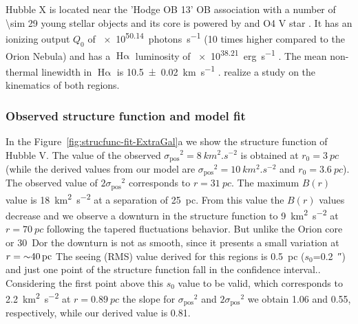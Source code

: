 \documentclass[fleqn,usenatbib, useAMS, a4paper]{mnras}
\newcommand\pos{\ensuremath{_{\mathrm{pos}}}}
\newcommand\ha{\ensuremath{\text{H}\upalpha}}
\begin{document}
Hubble X is located near the 'Hodge OB 13' OB association with a number of \num{\sim 29} young stellar objects \citep{2021MNRAS.507.5106K} and its core is powered by and O4 V star \citep{1999PASP..111.1382O}.
It has an ionizing output \(Q_0\) of \SI{e50.14}{photons.s^{-1}} (10 times higher compared to the Orion Nebula) and has a \ha{} luminosity of \SI{e38.21}{erg.s^{-1}} \citep{2002MNRAS.329..481B}.
The mean non-thermal linewidth in \ha{} is \SI{10.5 \pm 0.02}{km.s^{-1}}  \citep{1986A&A...160..374H}.
\citet{1993PASJ...45..693T} realize a study on the kinematics of both regions. 


\subsubsection{Observed structure function and model fit}
\label{sec:observ-struct-funct-hubbles}

In the Figure~\ref{fig:strucfunc-fit-ExtraGal}a we show the structure function of Hubble V.
The value of the observed \(\sigma\pos^2 = \SI{8}{km^{2}.s^{-2}}\) is obtained at \(r_0 = \SI{3}{pc} \) (while the derived values from our model are \(\sigma\pos^2 = \SI{10}{km^{2}.s^{-2}}\) and \(r_0 = \SI{3.6}{pc} \)).
The observed value of \(2\sigma\pos^2\) corresponds to \(r = \SI{31}{pc} \).
The maximum \(B(r)\) value is \SI{18}{km^{2}.s^{-2}} at a separation of \SI{25}{pc}. 
From this value the \(B(r)\) values decrease and we observe a downturn in the structure function to \SI{9}{km^{2}.s^{-2}} at \(r =  \SI{70}{pc}\) following the tapered fluctuations behavior.
But unlike the Orion core or 30~Dor the downturn is not as smooth, since it presents a small variation at \(r = \SI{\sim 40}{pc} \) 
The seeing (RMS) value derived for this regions is \SI{0.5}{pc} (\(s_0\)=\SI{0.2}{\arcsecond}) and just one point of the structure function fall in the confidence interval..
Considering the first point above this \(s_0\) value to be valid, which corresponds to \SI{2.2}{km^{2}.s^{-2}} at \(r = \SI{0.89}{pc} \) the slope for \(\sigma\pos^2\) and \(2\sigma\pos^2\) we obtain \num{1.06} and \num{0.55}, respectively, while our derived value is \num{0.81}.
\end{document}
